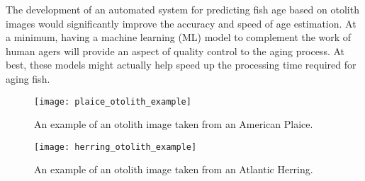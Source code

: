 The development of an automated system for predicting fish age based on otolith images would significantly improve the accuracy and speed of age estimation.
At a minimum, having a machine learning (ML) model to complement the work of human agers will provide an aspect of quality control to the aging process.
At best, these models might actually help speed up the processing time required for aging fish.

\pagebreak

\begin{figure}
    \texttt{[image: plaice\_otolith\_example]}
    \caption{An example of an otolith image taken from an American Plaice.}
    \label{fig:plaice_oto_example}
\end{figure}

\begin{figure}
    \texttt{[image: herring\_otolith\_example]}
    \caption{An example of an otolith image taken from an Atlantic Herring.}
    \label{fig:herring_oto_example}
\end{figure}

